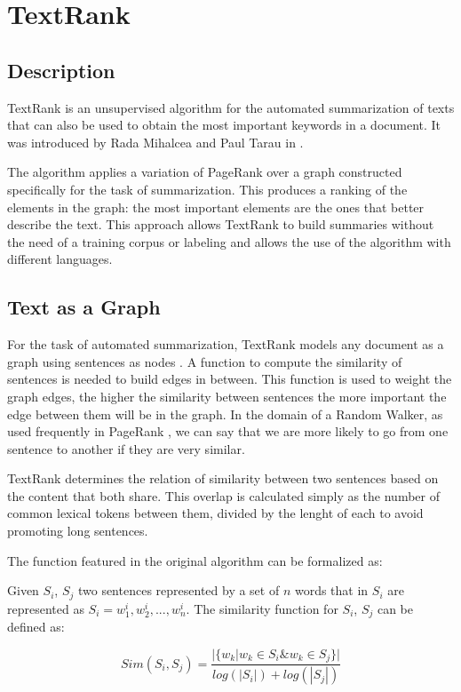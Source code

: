 \documentclass{llncs}
\begin{document}
\section{TextRank}

\subsection{Description}
TextRank is an unsupervised algorithm for the automated summarization of texts that can also be used to obtain the most important keywords in a document. It was introduced by Rada Mihalcea and Paul Tarau in \cite{mihalcea-tarau}.

The algorithm applies a variation of PageRank \cite{pageetal98} over a graph constructed specifically for the task of summarization. This produces a ranking of the elements in the graph: the most important elements are the ones that better describe the text. This approach allows TextRank to build summaries without the need of a training corpus or labeling and allows the use of the algorithm with different languages.

\subsection{Text as a Graph}
For the task of automated summarization, TextRank models any document as a graph using sentences as nodes \cite{introductionir}. A function to compute the similarity of sentences is needed to build edges in between. This function is used to weight the graph edges, the higher the similarity between sentences the more important the edge between them will be in the graph. In the domain of a Random Walker, as used frequently in PageRank \cite{pageetal98}, we can say that we are more likely to go from one sentence to another if they are very similar. 

TextRank determines the relation of similarity between two sentences based on the content that both share. This overlap is calculated simply as the number of common lexical tokens between them, divided by the lenght of each to avoid promoting long sentences.

The function featured in the original algorithm can be formalized as:

\begin{definicion}
Given $S_i$, $S_j$ two sentences represented by a set of $n$ words that in 
$S_i$ are represented as $S_i = w_{1}^{i}, w_{2}^{i},..., w_{n}^{i}$. The similarity function for $S_i$, $S_j$ can be defined as:


\begin{equation}
Sim(S_{i},S_{j}) = \frac{ | \{   w_{k} | w_{k} \in S_{i} \& w_{k} \in S_{j}   \}  | }    
                              {  log(|S_{i}|) + log(|S_{j}|)  }
\end{equation}


\end{definicion}
\end{document}
